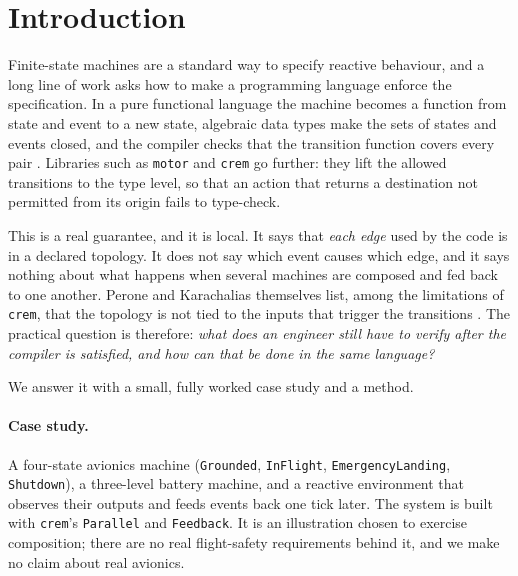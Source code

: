\documentclass[review]{jfp-epi}
\newcommand{\crem}{\texttt{crem}}
\newcommand{\code}[1]{\texttt{#1}}
\begin{document}
\section{Introduction}

Finite-state machines are a standard way to specify reactive behaviour, and a long line of work asks how to make a programming language enforce the specification. In a pure functional language the machine becomes a function from state and event to a new state, algebraic data types make the sets of states and events closed, and the compiler checks that the transition function covers every pair \cite{hutton2016haskell,malakhovski2009fsm}. Libraries such as \texttt{motor} \cite{motor} and \crem{} \cite{perone2023crem} go further: they lift the allowed transitions to the type level, so that an action that returns a destination not permitted from its origin fails to type-check.

This is a real guarantee, and it is local. It says that \emph{each edge} used by the code is in a declared topology. It does not say which event causes which edge, and it says nothing about what happens when several machines are composed and fed back to one another. Perone and Karachalias themselves list, among the limitations of \crem{}, that the topology is not tied to the inputs that trigger the transitions \cite{perone2023crem}. The practical question is therefore: \emph{what does an engineer still have to verify after the compiler is satisfied, and how can that be done in the same language?}

We answer it with a small, fully worked case study and a method.

\paragraph{Case study.} A four-state avionics machine (\code{Grounded}, \code{InFlight}, \code{EmergencyLanding}, \code{Shutdown}), a three-level battery machine, and a reactive environment that observes their outputs and feeds events back one tick later. The system is built with \crem{}'s \code{Parallel} and \code{Feedback}. It is an illustration chosen to exercise composition; there are no real flight-safety requirements behind it, and we make no claim about real avionics.
\end{document}
